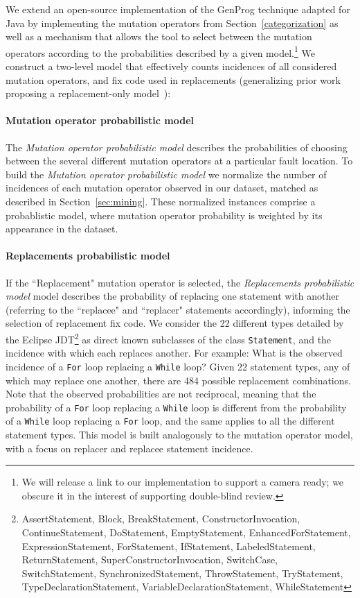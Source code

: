 \documentclass[conference]{IEEEtran}
\begin{document}
We extend an open-source implementation of the GenProg technique adapted for Java
by implementing the mutation operators from
Section~\ref{categorization} as well as a mechanism that allows the tool to
select between the mutation operators according to the probabilities described by
a given model.\footnote{We will release a link to our implementation to support
  a camera ready; we obscure it in the interest of supporting double-blind
  review.}  We construct a two-level model that effectively counts incidences of all considered
mutation operators, and fix code used in replacements  (generalizing prior work
proposing a replacement-only model~\cite{Soto15}):

\paragraph{Mutation operator probabilistic model}
The \textit{Mutation operator probabilistic model} 
describes the probabilities of choosing between the several different mutation 
operators at a particular fault location.
%
To build the \textit{Mutation operator probabilistic model} 
we normalize the number of incidences of each mutation operator observed in our
dataset, matched as described in Section~\ref{sec:mining}.  These normalized
instances comprise a probablistic model, where mutation operator probability is
weighted by its appearance in the dataset.  

\paragraph{Replacements probabilistic model}
If the ``Replacement" mutation operator is 
selected, the \textit{Replacements probabilistic model} model describes the probability of replacing one statement with
another  (referring to the 
``replacee" and ``replacer" statements accordingly), informing the selection of replacement fix code.
We consider 
the 22 different types detailed by the Eclipse
JDT\footnote{AssertStatement, Block, BreakStatement, ConstructorInvocation, ContinueStatement, DoStatement, EmptyStatement, EnhancedForStatement, ExpressionStatement, ForStatement, IfStatement, LabeledStatement, ReturnStatement, SuperConstructorInvocation, SwitchCase, SwitchStatement, SynchronizedStatement, ThrowStatement, TryStatement, TypeDeclarationStatement, VariableDeclarationStatement, WhileStatement} as
direct known subclasses of the class \texttt{Statement}, and the incidence with which
each 
replaces another. For example: What is the observed incidence of a \texttt{For} loop 
replacing a \texttt{While} loop? Given 22 statement types, any of which may replace one
another, there are 484 possible replacement combinations. 
Note that the observed probabilities are not reciprocal, meaning 
that the probability of a \texttt{For} loop replacing a \texttt{While} loop is different from the 
probability of a \texttt{While} loop replacing a \texttt{For} loop, and the same applies to all 
the different statement types.
This model is built analogously to the
mutation operator model, with a focus on replacer and replacee statement incidence.
\end{document}
